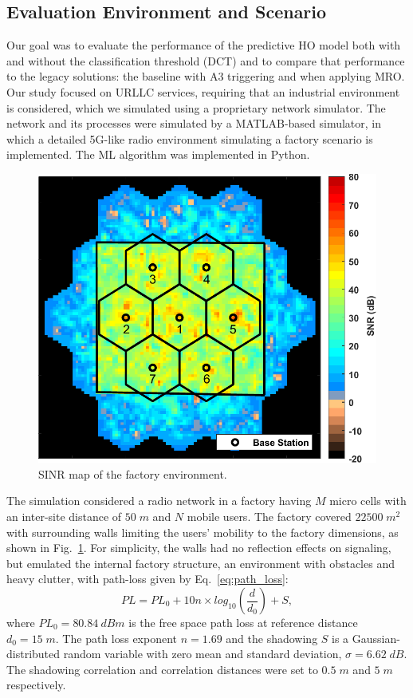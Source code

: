 		\subsection{Evaluation Environment and Scenario}
		
			Our goal was to evaluate the performance of the predictive \ac{HO} model both with and without the classification threshold (\ac{DCT}) and to compare that performance to the legacy solutions: the baseline with A3 triggering and when applying \ac{MRO}.
			Our study focused on \ac{URLLC} services, requiring that an industrial environment is considered, which we simulated using a proprietary network simulator.
			The network and its processes were simulated by a MATLAB-based simulator, in which a detailed 5G-like radio environment simulating a factory scenario is implemented.
			The \ac{ML} algorithm was implemented in Python.
			
			\begin{figure}[ht]
				\centering
				\includegraphics[width=0.6\linewidth]{figures/09_pred_ho/pred_ho_snr_map/pred_ho_snr_map.pdf}
				\caption[SINR map of the simulated scenario in the predictive handover evaluation]{SINR map of the factory environment.}
				\label{fig:snr_map}
			\end{figure}
			
			The simulation considered a radio network in a factory having $M$ micro cells with an inter-site distance of $50\;m$ and $N$ mobile users.
			The factory covered $22500\;m^2$ with surrounding walls limiting the users’ mobility to the factory dimensions, as shown in Fig.~\ref{fig:snr_map}.
			For simplicity, the walls had no reflection effects on signaling, but emulated the internal factory structure, an environment with obstacles and heavy clutter, with path-loss given by Eq.~\ref{eq:path_loss}:
			\begin{equation}
				\label{eq:path_loss}
				PL = PL_0 + 10n\times log_{10}(\dfrac{d}{d_0}) + S,
			\end{equation}
			where $PL_0=80.84\:dBm$ is the free space path loss at reference distance $d_0=15\;m$.
			The path loss exponent $n=1.69$ and the shadowing $S$ is a Gaussian-distributed random variable with zero mean and standard deviation, $\sigma=6.62\;dB$.
			The shadowing correlation and correlation distances were set to $0.5\;m$ and $5\;m$ respectively.
		

